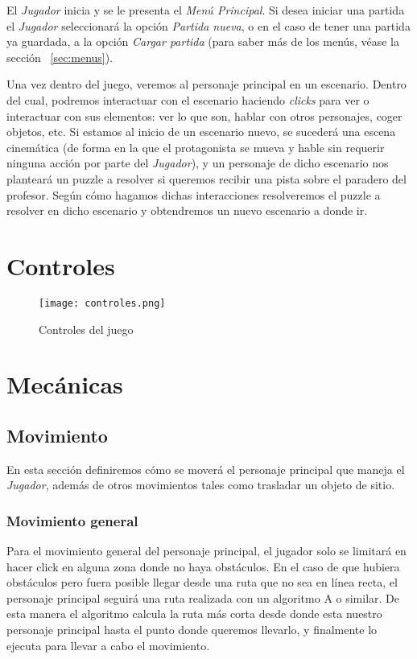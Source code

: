         El \emph{Jugador} inicia \nombrejuego y se le presenta el \emph{Menú Principal}. Si desea iniciar una partida el \emph{Jugador} seleccionará la opción \emph{Partida nueva}, o en el caso de tener una partida ya guardada, a la opción \emph{Cargar partida} (para saber más de los menús, véase la sección ~\ref{sec:menus}).
        
        Una vez dentro del juego, veremos al personaje principal en un escenario. Dentro del cual, podremos interactuar con el escenario haciendo \emph{clicks} para ver o interactuar con sus elementos: ver lo que son, hablar con otros personajes, coger objetos, etc. Si estamos al inicio de un escenario nuevo, se sucederá una escena cinemática (de forma en la que el protagonista se mueva y hable sin requerir ninguna acción por parte del \emph{Jugador}), y un personaje de dicho escenario nos planteará un puzzle a resolver si queremos recibir una pista sobre el paradero del profesor. Según cómo hagamos dichas interacciones resolveremos el puzzle a resolver en dicho escenario y obtendremos un nuevo escenario a donde ir.
    
    \section{Controles}
        
        \begin{figure}[H] 
			\begin{center}
				\texttt{[image: controles.png]}
			\end{center}
			\caption{Controles del juego}
			\label{fig:controles}
		\end{figure}
    
    \section{Mecánicas}
        
        \subsection{Movimiento}
        En esta sección definiremos cómo se moverá el personaje principal que maneja el \emph{Jugador}, además de otros movimientos tales como trasladar un objeto de sitio.
            
            \subsubsection{Movimiento general}
            Para el movimiento general del personaje principal, el jugador solo se limitará en hacer click en alguna zona donde no haya obstáculos. En el caso de que hubiera obstáculos pero fuera posible llegar desde una ruta que no sea en línea recta, el personaje principal seguirá una ruta realizada con un algoritmo A\* o similar. De esta manera el algoritmo calcula la ruta más corta desde donde esta nuestro personaje principal hasta el punto donde queremos llevarlo, y finalmente lo ejecuta para llevar a cabo el movimiento.
            
